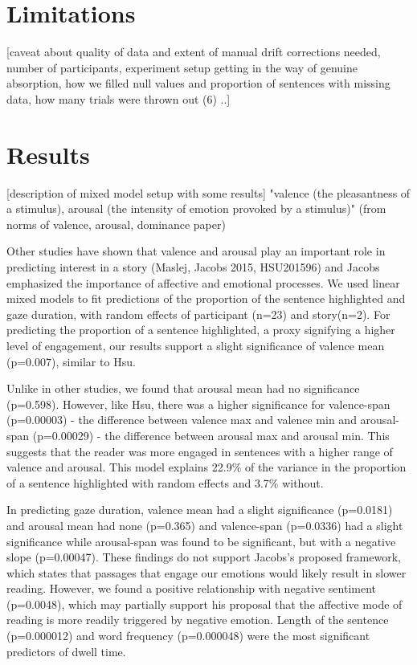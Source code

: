 \documentclass[11pt]{article}
\begin{document}
\section{Limitations}

[caveat about quality of data and extent of manual drift corrections needed, number of participants, experiment setup getting in the way of genuine absorption, how we filled null values and proportion of sentences with missing data, how many trials were thrown out (6) ..]

\section{Results}

[description of mixed model setup with some results]
"valence (the pleasantness of a stimulus), arousal (the intensity of emotion provoked by a stimulus)" (from norms of valence, arousal, dominance paper)

Other studies have shown that valence and arousal play an important role in predicting interest in a story (Maslej, Jacobs 2015, HSU201596) and Jacobs emphasized the importance of affective and emotional processes. We used linear mixed models to fit predictions of the proportion of the sentence highlighted and gaze duration, with random effects of participant (n=23) and story(n=2). For predicting the proportion of a sentence highlighted, a proxy signifying a higher level of engagement, our results support a slight significance of valence mean (p=0.007), similar to Hsu.

Unlike in other studies, we found that arousal mean had no significance (p=0.598).  However, like Hsu, there was a higher significance for valence-span (p=0.00003) - the difference between valence max and valence min and arousal-span (p=0.00029) - the difference between arousal max and arousal min. This suggests that the reader was more engaged in sentences with a higher range of valence and arousal. This model explains 22.9\% of the variance in the proportion of a sentence highlighted with random effects and 3.7\% without.

In predicting gaze duration, valence mean had a slight significance (p=0.0181) and arousal mean had none (p=0.365) and valence-span (p=0.0336) had a slight significance while arousal-span was found to be significant, but with a negative slope (p=0.00047). These findings do not support Jacobs's proposed framework, which states that passages that engage our emotions would likely result in slower reading. However, we found a positive relationship with negative sentiment (p=0.0048), which may partially support his proposal that the affective mode of reading is more readily triggered by negative emotion. Length of the sentence (p=0.000012) and word frequency (p=0.000048) were the most significant predictors of dwell time. 
\end{document}
